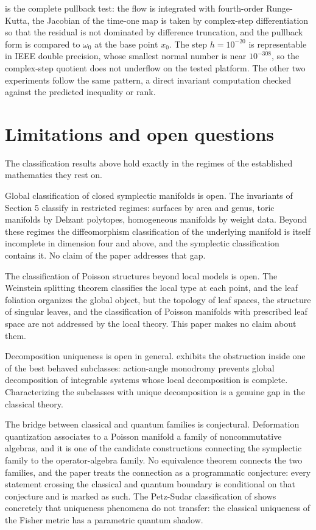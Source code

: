 \documentclass[11pt,letterpaper]{article}
\theoremstyle{definition}
\theoremstyle{remark}
\begin{document}
 is the complete pullback test: the flow is integrated with fourth-order Runge-Kutta, the Jacobian of the time-one map is taken by complex-step differentiation so that the residual is not dominated by difference truncation, and the pullback form is compared to $\omega_0$ at the base point $x_0$. The step $h = 10^{-20}$ is representable in IEEE double precision, whose smallest normal number is near $10^{-308}$, so the complex-step quotient does not underflow on the tested platform. The other two experiments follow the same pattern, a direct invariant computation checked against the predicted inequality or rank.

\section{Limitations and open questions}

The classification results above hold exactly in the regimes of the established mathematics they rest on.

Global classification of closed symplectic manifolds is open. The invariants of Section 5 classify in restricted regimes: surfaces by area and genus, toric manifolds by Delzant polytopes, homogeneous manifolds by weight data. Beyond these regimes the diffeomorphism classification of the underlying manifold is itself incomplete in dimension four and above, and the symplectic classification contains it. No claim of the paper addresses that gap.

The classification of Poisson structures beyond local models is open. The Weinstein splitting theorem classifies the local type at each point, and the leaf foliation organizes the global object, but the topology of leaf spaces, the structure of singular leaves, and the classification of Poisson manifolds with prescribed leaf space are not addressed by the local theory. This paper makes no claim about them.

Decomposition uniqueness is open in general.  exhibits the obstruction inside one of the best behaved subclasses: action-angle monodromy prevents global decomposition of integrable systems whose local decomposition is complete. Characterizing the subclasses with unique decomposition is a genuine gap in the classical theory.

The bridge between classical and quantum families is conjectural. Deformation quantization associates to a Poisson manifold a family of noncommutative algebras, and it is one of the candidate constructions connecting the symplectic family to the operator-algebra family. No equivalence theorem connects the two families, and the paper treats the connection as a programmatic conjecture: every statement crossing the classical and quantum boundary is conditional on that conjecture and is marked as such. The Petz-Sudar classification of  shows concretely that uniqueness phenomena do not transfer: the classical uniqueness of the Fisher metric has a parametric quantum shadow.
\end{document}
